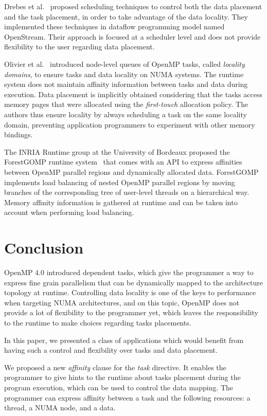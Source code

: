 \documentclass{Styles/llncs}
\begin{document}
Drebes et al.~\cite{Drebes:2014:TDS:2658949.2641764} proposed scheduling
techniques to control both the data placement and the task placement, in order to
take advantage of the data locality. They implemented these techniques
in dataflow programming model named OpenStream.
Their approach is focused at a scheduler level and does not provide
flexibility to the user regarding data placement.

Olivier et
al.~\cite{Olivier:2012:CMW:2388996.2389085}
introduced node-level queues of OpenMP tasks, called \textit{locality
  domains}, to ensure tasks and data locality on NUMA systems. The
runtime system does not maintain affinity information between tasks
and data during execution. Data placement is implicitly obtained
considering that the tasks access memory pages that were allocated
using the \textit{first-touch} allocation policy. The authors thus
ensure locality by always scheduling a task on the same locality
domain, preventing application programmers to experiment with other
memory bindings.

The INRIA Runtime group at the University of Bordeaux proposed the
ForestGOMP runtime system~\cite{BroFurGogWacNam10IJPP} that comes
with an API to express affinities between OpenMP parallel regions and
dynamically allocated data. ForestGOMP implements load balancing of
nested OpenMP parallel regions by moving branches of the corresponding
tree of user-level threads on a hierarchical way. Memory affinity
information is gathered at runtime and can be taken into account when
performing load balancing.

\section{Conclusion}

OpenMP 4.0 introduced dependent tasks, which give the programmer a way to
express fine grain parallelism that can be dynamically mapped to the architecture
topology at runtime.
Controlling data locality is one of the keys to performance when targeting NUMA architectures,
and on this topic, OpenMP does not provide a lot of flexibility to the programmer yet,
which leaves the responsibility to the runtime to make choices regarding tasks
placements.

In this paper, we presented a class of applications which would benefit
from having such a control and flexibility over tasks and data placement.

We proposed a new \emph{affinity} clause for the \emph{task} directive.
It enables the programmer to give hints to the runtime about
tasks placement during the program execution, which can be used to control the data
mapping. The programmer can express affinity between a task and the following resources: a thread, a NUMA node, and
a data.
\end{document}
